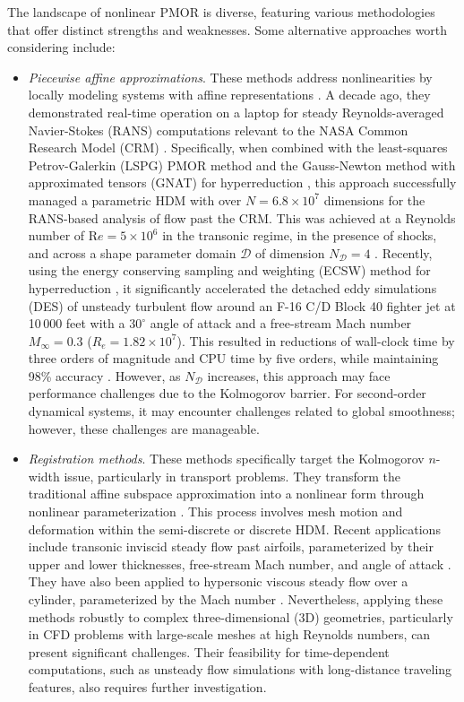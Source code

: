 \documentclass[preprint,10pt]{elsarticle}
\begin{document}
The landscape of nonlinear PMOR is diverse, featuring various methodologies that offer distinct strengths and weaknesses. Some alternative approaches worth considering include:
\begin{itemize}
	\item {\it Piecewise affine approximations}. These methods address nonlinearities by locally modeling systems with affine 
		representations \cite{amsallem2012nonlinear, grimberg2021mesh}. A decade ago, they demonstrated real-time operation on a laptop for steady Reynolds-averaged Navier-Stokes (RANS) computations relevant to 
		the NASA Common Research Model (CRM) \cite{rivers2014experimental}. Specifically, when combined with the least-squares Petrov-Galerkin (LSPG) PMOR method 
		\cite{carlberg2011efficient, carlberg2013gnat} and the Gauss-Newton method with approximated tensors (GNAT) for hyperreduction \cite{carlberg2011efficient}, 
		this approach successfully managed a parametric HDM with over $N = 6.8 \times 10^7$ dimensions for the RANS-based analysis of flow past the CRM. This was achieved at 
		a Reynolds number of $\text{R}e = 5 \times 10^6$ in the transonic regime, in the presence of shocks, and across a shape parameter domain $\mathcal {D}$ of dimension 
		$N_{\mathcal{D}} = 4$ \cite{washabaugh2016use}. Recently, using the energy conserving sampling and weighting (ECSW) method for hyperreduction \cite{farhat2015structure}, it significantly 
		accelerated the detached eddy simulations (DES) of unsteady turbulent flow around an F-16 C/D Block 40 fighter jet at 10\,000 feet with a $30^\circ$ angle of attack 
		and a free-stream Mach number $M_{\infty} = 0.3$ ($R_e = 1.82 \times 10^7$). This resulted in reductions of wall-clock time by three orders of magnitude and CPU time 
		by five orders, while maintaining 98\% accuracy \cite{grimberg2021mesh}. However, as $N_{\mathcal{D}}$ increases, this approach may face performance challenges due to the Kolmogorov barrier. 
		For second-order dynamical systems, it may encounter challenges related to global smoothness; however, these challenges are manageable.
	\item {\it Registration methods}. These methods specifically target the Kolmogorov $n$-width issue, particularly in transport problems. They transform the traditional affine 
		subspace approximation into a nonlinear form through nonlinear parameterization \cite{taddei2020registration, mirhoseini2022model}. This process involves mesh motion 
		and deformation within the semi-discrete or discrete HDM. Recent applications include transonic inviscid steady flow past airfoils, parameterized by their 
		upper and lower thicknesses, free-stream Mach number, and angle of attack \cite{taddei2021registration}. They have also been applied to hypersonic viscous steady
		flow over a cylinder, parameterized by the Mach number \cite{zucatti2025model}. Nevertheless, applying these methods robustly to complex three-dimensional (3D) geometries, 
		particularly in CFD problems with large-scale meshes at high Reynolds numbers, can present significant challenges. Their feasibility for time-dependent computations, 
		such as unsteady flow simulations with long-distance traveling features, also requires further investigation.


\end{itemize}
\end{document}
